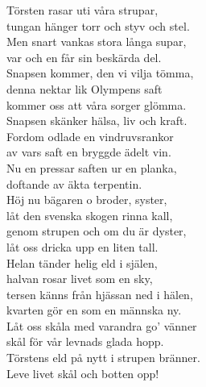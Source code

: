 \documentclass[a6paper, 10pt, twoside]{article}
\begin{document}
\noindent
\begin{center}
\end{center}
\begin{lyrics}
Törsten rasar uti våra strupar, \\
tungan hänger torr och styv och stel. \\
Men snart vankas stora långa supar, \\
var och en får sin beskärda del. \\
Snapsen kommer, den vi vilja tömma, \\
denna nektar lik Olympens saft \\
kommer oss att våra sorger glömma. \\
Snapsen skänker hälsa, liv och kraft. 
\vspace{5pt}\\
Fordom odlade en vindruvsrankor \\
av vars saft en bryggde ädelt vin. \\
Nu en pressar saften ur en planka, \\
doftande av äkta terpentin. \\
Höj nu bägaren o broder, syster, \\
låt den svenska skogen rinna kall, \\
genom strupen och om du är dyster, \\
låt oss dricka upp en liten tall. 
\vspace{5pt}\\
Helan tänder helig eld i själen, \\
halvan rosar livet som en sky, \\
tersen känns från hjässan ned i hälen, \\
kvarten gör en som en männska ny. \\
Låt oss skåla med varandra go' vänner \\
skål för vår levnads glada hopp. \\
Törstens eld på nytt i strupen bränner. \\
Leve livet skål och botten opp! 
\end{lyrics}
\end{document}
